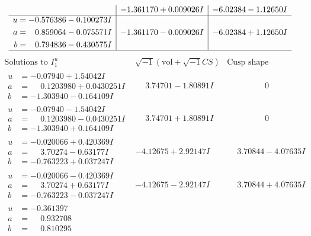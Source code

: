 \documentclass[1p]{elsarticle_modified}
\theoremstyle{definition}
\newcommand{\I}{\sqrt{-1}}
\begin{document}
$$\begin{array}{c|c|c}
 & -1.361170 + 0.009026 I & -6.02384 - 1.12650 I \\ \hline\begin{aligned}
u &= -0.576386 - 0.100273 I \\
a &= \phantom{-}0.859064 - 0.075571 I \\
b &= \phantom{-}0.794836 - 0.430575 I\end{aligned}
 & -1.361170 - 0.009026 I & -6.02384 + 1.12650 I\\
 \hline 
 \end{array}$$\newpage$$\begin{array}{c|c|c}  
\text{Solutions to }I^u_{1}& \I (\text{vol} + \sqrt{-1}CS) & \text{Cusp shape}\\
 \hline 
\begin{aligned}
u &= -0.07940 + 1.54042 I \\
a &= \phantom{-}0.1203980 + 0.0430251 I \\
b &= -1.303940 - 0.164109 I\end{aligned}
 & \phantom{-}3.74701 - 1.80891 I & \phantom{-0.000000 } 0 \\ \hline\begin{aligned}
u &= -0.07940 - 1.54042 I \\
a &= \phantom{-}0.1203980 - 0.0430251 I \\
b &= -1.303940 + 0.164109 I\end{aligned}
 & \phantom{-}3.74701 + 1.80891 I & \phantom{-0.000000 } 0 \\ \hline\begin{aligned}
u &= -0.020066 + 0.420369 I \\
a &= \phantom{-}3.70274 - 0.63177 I \\
b &= -0.763223 + 0.037247 I\end{aligned}
 & -4.12675 + 2.92147 I & \phantom{-}3.70844 - 4.07635 I \\ \hline\begin{aligned}
u &= -0.020066 - 0.420369 I \\
a &= \phantom{-}3.70274 + 0.63177 I \\
b &= -0.763223 - 0.037247 I\end{aligned}
 & -4.12675 - 2.92147 I & \phantom{-}3.70844 + 4.07635 I \\ \hline\begin{aligned}
u &= -0.361397\phantom{ +0.000000I} \\
a &= \phantom{-}0.932708\phantom{ +0.000000I} \\
b &= \phantom{-}0.810295\phantom{ +0.000000I}\end{aligned}

\end{array}$$
\end{document}

